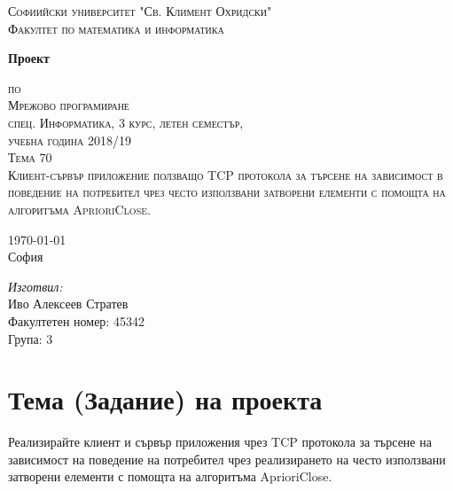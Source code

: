 \documentclass[a4paper, 12pt]{article}
\newcommand{\univname}{Софиийски университет "Св. Климент Охридски"\\Факултет по математика и информатика}
\begin{document}
\begin{titlepage}
\begin{center}
    
\vspace*{.06\textheight}
{\scshape\large \univname\par}\vspace{1.5cm}

{\huge \bfseries{Проект}\par}\vspace{0.7cm}
\textsc{\small по}\\[0.6cm]
\textsc{\Large Мрежово програмиране}\\[0.5cm]
\textsc{\normalsize спец. Информатика, 3 курс, летен семестър,}\\[0.5cm]
\textsc{\normalsize учебна година 2018/19}\\[0.6cm]
\textsc{\large Тема 70}\\[1cm]
\textsc{\large Клиент-сървър приложение ползващо TCP протокола за търсене на
зависимост в поведение на потребител чрез често
използвани затворени елементи с помощта на алгоритъма AprioriClose.}\\[2cm]
     
\begin{minipage}[t]{0.4\textwidth}
\begin{flushleft} \large
{\large \today}\\[1cm]
София
\end{flushleft}
\end{minipage}
\begin{minipage}[t]{0.4\textwidth}
\begin{flushright} \large
\emph{Изготвил:}\\[0.5cm]
Иво Алексеев Стратев\\[0.5cm]
Факултетен номер: 45342\\[0.2cm]
Група: 3
\end{flushright}
\end{minipage}
\end{center}
\end{titlepage}

\tableofcontents

\pagebreak

\section{Тема (Задание) на проекта}
Реализирайте клиент и сървър приложения чрез TCP протокола за търсене на
зависимост на поведение на потребител чрез реализирането на често
използвани затворени елементи с помощта на алгоритъма AprioriClose.
\end{document}

